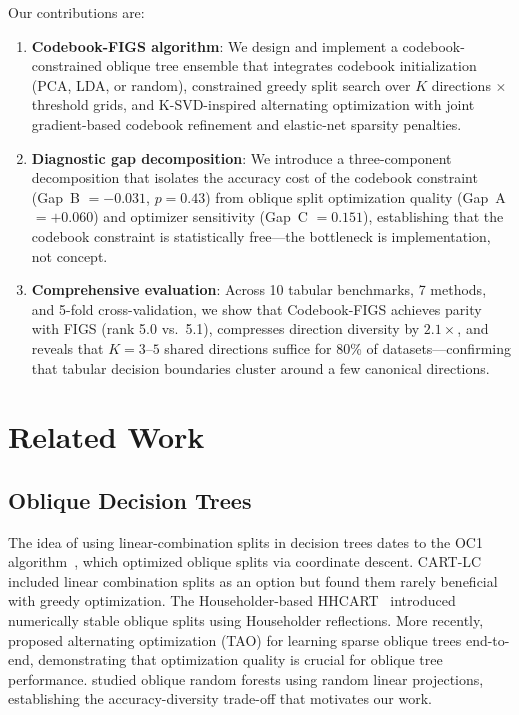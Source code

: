 \documentclass[11pt,letterpaper]{article}
\begin{document}
Our contributions are:
\begin{enumerate}[leftmargin=*]
    \item \textbf{Codebook-FIGS algorithm}: We design and implement a codebook-constrained oblique tree ensemble that integrates codebook initialization (PCA, LDA, or random), constrained greedy split search over $K$ directions $\times$ threshold grids, and K-SVD-inspired alternating optimization with joint gradient-based codebook refinement and elastic-net sparsity penalties.

    \item \textbf{Diagnostic gap decomposition}: We introduce a three-component decomposition that isolates the accuracy cost of the codebook constraint (Gap~B $= -0.031$, $p = 0.43$) from oblique split optimization quality (Gap~A $= +0.060$) and optimizer sensitivity (Gap~C $= 0.151$), establishing that the codebook constraint is statistically free---the bottleneck is implementation, not concept.

    \item \textbf{Comprehensive evaluation}: Across 10 tabular benchmarks, 7 methods, and 5-fold cross-validation, we show that Codebook-FIGS achieves parity with FIGS (rank 5.0 vs.\ 5.1), compresses direction diversity by $2.1\times$, and reveals that $K = 3$--$5$ shared directions suffice for 80\% of datasets---confirming that tabular decision boundaries cluster around a few canonical directions.
\end{enumerate}

\section{Related Work}

\subsection{Oblique Decision Trees}

The idea of using linear-combination splits in decision trees dates to the OC1 algorithm~\citep{Murthy1994}, which optimized oblique splits via coordinate descent. CART-LC~\citep{Breiman1984} included linear combination splits as an option but found them rarely beneficial with greedy optimization. The Householder-based HHCART~\citep{Wickramarachchi2016} introduced numerically stable oblique splits using Householder reflections. More recently, \citet{CarreiraPerpinan2018} proposed alternating optimization (TAO) for learning sparse oblique trees end-to-end, demonstrating that optimization quality is crucial for oblique tree performance. \citet{Menze2011} studied oblique random forests using random linear projections, establishing the accuracy-diversity trade-off that motivates our work.
\end{document}
